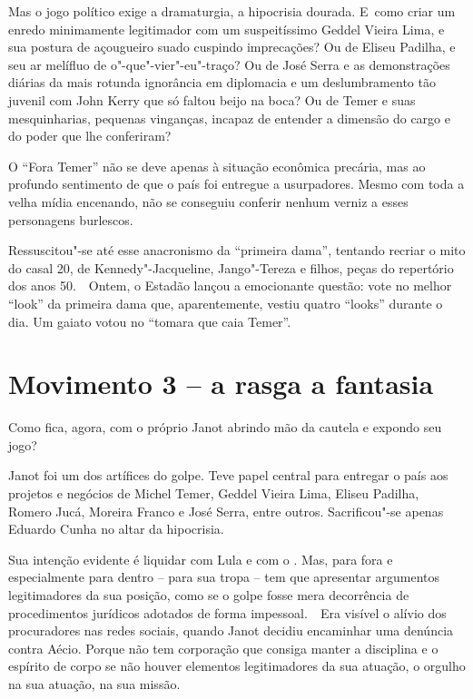 Mas o jogo político exige a dramaturgia, a hipocrisia dourada. E~como
criar um enredo minimamente legitimador com um suspeitíssimo Geddel
Vieira Lima, e sua postura de açougueiro suado cuspindo imprecações? Ou
de Eliseu Padilha, e seu ar melífluo de o"-que"-vier"-eu"-traço? Ou de José
Serra e as demonstrações diárias da mais rotunda ignorância em
diplomacia e um deslumbramento tão juvenil com John Kerry que só faltou
beijo na boca? Ou de Temer e suas mesquinharias, pequenas vinganças,
incapaz de entender a dimensão do cargo e do poder que lhe conferiram?

O ``Fora Temer'' não se deve apenas à situação econômica precária, mas
ao profundo sentimento de que o país foi entregue a usurpadores. Mesmo
com toda a velha mídia encenando, não se conseguiu conferir nenhum
verniz a esses personagens burlescos.

Ressuscitou"-se até esse anacronismo da ``primeira dama'', tentando
recriar o mito do casal 20, de Kennedy"-Jacqueline, Jango"-Tereza e
filhos, peças do repertório dos anos 50.~~Ontem, o Estadão lançou a
emocionante questão: vote no melhor ``look'' da primeira dama que,
aparentemente, vestiu quatro ``looks'' durante o dia. Um gaiato votou no
``tomara que caia Temer''.

\section{Movimento 3 -- a  rasga a fantasia}

Como fica, agora, com o próprio Janot abrindo mão da cautela e expondo
seu jogo?

Janot foi um dos artífices do golpe. Teve papel central para entregar o
país aos projetos e negócios de Michel Temer, Geddel Vieira Lima, Eliseu
Padilha, Romero Jucá, Moreira Franco e José Serra, entre outros.
Sacrificou"-se apenas Eduardo Cunha no altar da hipocrisia.

Sua intenção evidente é liquidar com Lula e com o . Mas, para fora e
especialmente para dentro -- para sua tropa -- tem que apresentar
argumentos legitimadores da sua posição, como se o golpe fosse mera
decorrência de procedimentos jurídicos adotados de forma impessoal.~~Era
visível o alívio dos procuradores nas redes sociais, quando Janot
decidiu encaminhar uma denúncia contra Aécio. Porque não tem corporação
que consiga manter a disciplina e o espírito de corpo se não houver
elementos legitimadores da sua atuação, o orgulho na sua atuação, na sua
missão.

